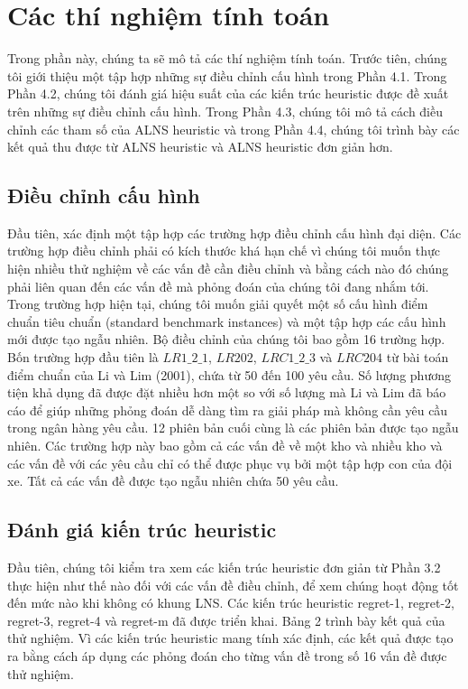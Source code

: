 \chapter{Các thí nghiệm tính toán}
Trong phần này, chúng ta sẽ mô tả các thí nghiệm tính toán. Trước tiên, chúng tôi giới thiệu một tập hợp những sự điều chỉnh cấu hình trong Phần 4.1. Trong Phần 4.2, chúng tôi đánh giá hiệu suất của các kiến trúc heuristic được đề xuất trên những sự điều chỉnh cấu hình. Trong Phần 4.3, chúng tôi mô tả cách điều chỉnh các tham số của ALNS heuristic và trong Phần 4.4, chúng tôi trình bày các kết quả thu được từ ALNS heuristic và ALNS heuristic đơn giản hơn.

\section{Điều chỉnh cấu hình}
Đầu tiên, xác định một tập hợp các trường hợp điều chỉnh cấu hình đại diện. Các trường hợp điều chỉnh phải có kích thước khá hạn chế vì chúng tôi muốn thực hiện nhiều thử nghiệm về các vấn đề cần điều chỉnh và bằng cách nào đó chúng phải liên quan đến các vấn đề mà phỏng đoán của chúng tôi đang nhắm tới. Trong trường hợp hiện tại, chúng tôi muốn giải quyết một số cấu hình điểm chuẩn tiêu chuẩn (standard benchmark instances) và một tập hợp các cấu hình mới được tạo ngẫu nhiên.
Bộ điều chỉnh của chúng tôi bao gồm 16 trường hợp. Bốn trường hợp đầu tiên là $LR1\_2\_1$, $LR202$, $LRC1\_2\_3$ và $LRC204$ từ bài toán điểm chuẩn của Li và Lim (2001), chứa từ 50 đến 100 yêu cầu. Số lượng phương tiện khả dụng đã được đặt nhiều hơn một so với số lượng mà Li và Lim đã báo cáo để giúp những phỏng đoán dễ dàng tìm ra giải pháp mà không cần yêu cầu trong ngân hàng yêu cầu. 12 phiên bản cuối cùng là các phiên bản được tạo ngẫu nhiên. Các trường hợp này bao gồm cả các vấn đề về một kho và nhiều kho và các vấn đề với các yêu cầu chỉ có thể được phục vụ bởi một tập hợp con của đội xe. Tất cả các vấn đề được tạo ngẫu nhiên chứa 50 yêu cầu.

\section{Đánh giá kiến trúc heuristic}
Đầu tiên, chúng tôi kiểm tra xem các kiến trúc heuristic đơn giản từ Phần 3.2 thực hiện như thế nào đối với các vấn đề điều chỉnh, để xem chúng hoạt động tốt đến mức nào khi không có khung LNS. Các kiến trúc heuristic regret-1, regret-2, regret-3, regret-4 và regret-m đã được triển khai. Bảng 2 trình bày kết quả của thử nghiệm. Vì các kiến trúc heuristic mang tính xác định, các kết quả được tạo ra bằng cách áp dụng các phỏng đoán cho từng vấn đề trong số 16 vấn đề được thử nghiệm.

